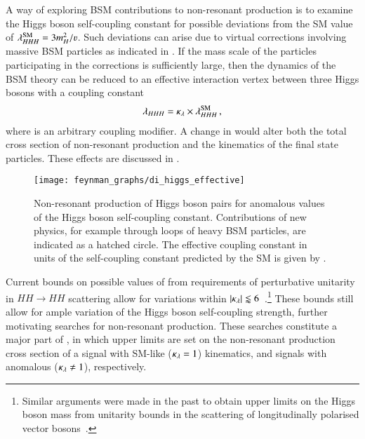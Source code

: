A way of exploring BSM contributions to non-resonant \HH production is to
examine the Higgs boson self-coupling constant for possible deviations from the
SM value of $\lambda_{HHH}^\text{SM} = 3 m_{H}^2 / \varv$. Such deviations can
arise due to virtual corrections involving massive BSM particles as indicated in
. If the mass scale of the particles participating in
the corrections is sufficiently large, then the dynamics of the BSM theory can
be reduced to an effective interaction vertex between three Higgs bosons with a
coupling constant
\begin{align*}
  \lambda_{HHH} = \kappa_{\lambda} \times \lambda_{HHH}^{\text{SM}} \,\text{,}
\end{align*}
where \klambda is an arbitrary coupling modifier. A change in \klambda would
alter both the total cross section of non-resonant \HH production and the
kinematics of the final state particles. These effects are discussed in
.

\begin{figure}[htbp]
  \centering

  \texttt{[image: feynman\_graphs/di\_higgs\_effective]}

  \caption[Feynman diagram of non-resonant \HH production with anomalous values
  of the Higgs boson self-coupling.]{Non-resonant production of Higgs boson
    pairs for anomalous values of the Higgs boson self-coupling constant.
    Contributions of new physics, for example through loops of heavy BSM
    particles, are indicated as a hatched circle. The effective coupling
    constant in units of the self-coupling constant predicted by the SM is given
    by \klambda.}%
  \label{fig:bsm_hh_prod_feyn}
\end{figure}

%
Current bounds on possible values of \klambda from requirements of perturbative
unitarity in $HH \to HH$ scattering allow for variations within
$|\kappa_{\lambda}| \lessapprox 6$~\cite{DiLuzio:2017tfn}.\footnote{Similar arguments
  were made in the past to obtain upper limits on the Higgs boson mass from
  unitarity bounds in the scattering of longitudinally polarised vector
  bosons~\cite{Lee:1977eg}.} These bounds still allow for ample variation of the
Higgs boson self-coupling strength, further motivating searches for non-resonant
\HH production. These searches constitute a major part of
, in which upper limits are set on the
non-resonant \HH production cross section of a signal with SM-like
($\kappa_{\lambda} = 1$) kinematics, and signals with anomalous \klambda
($\kappa_{\lambda} \neq 1$), respectively.

